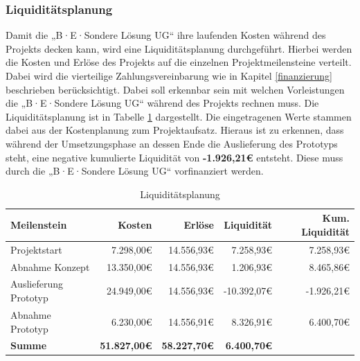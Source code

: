 \documentclass[
  a4paper,
  12pt,
  DIV=12,        %
  parskip=half,  %
  headings=small %
]{scrartcl}
\theoremstyle{definition}
\theoremstyle{definition}
\begin{document}
\subsubsection{Liquiditätsplanung}\label{Liquiditätsplanung}
Damit die „B·E·Sondere Lösung UG`` ihre laufenden Kosten während des Projekts decken kann, wird eine Liquiditätsplanung durchgeführt. Hierbei werden die Kosten und Erlöse des Projekts auf die einzelnen Projektmeilensteine verteilt. Dabei wird die vierteilige Zahlungsvereinbarung wie in Kapitel \ref{finanzierung} beschrieben berücksichtigt. Dabei soll erkennbar sein mit welchen Vorleistungen die „B·E·Sondere Lösung UG`` während des Projekts rechnen muss. Die Liquiditätsplanung ist in Tabelle \ref{tab:Liquiditaetsplanung} dargestellt. Die eingetragenen Werte stammen dabei aus der Kostenplanung zum Projektaufsatz. Hieraus ist zu erkennen, dass während der Umsetzungsphase an dessen Ende die Auslieferung des Prototyps steht, eine negative kumulierte Liquidität von \textbf{-1.926,21€} entsteht. Diese muss durch die „B·E·Sondere Lösung UG`` vorfinanziert werden. 

\begin{table}[H]
\centering
\small
\begin{tabular}{|l|r|r|r|r|}
\hline
\textbf{Meilenstein} & \textbf{Kosten} & \textbf{Erlöse} & \textbf{Liquidität} & \textbf{Kum. Liquidität} \\
\hline
Projektstart & 7.298,00€ & 14.556,93€ & 7.258,93€ & 7.258,93€ \\
\hline
Abnahme Konzept & 13.350,00€ & 14.556,93€ & 1.206,93€ & 8.465,86€ \\
\hline
Auslieferung Prototyp & 24.949,00€ & 14.556,93€ & -10.392,07€ & -1.926,21€ \\
\hline
Abnahme Prototyp & 6.230,00€ & 14.556,91€ & 8.326,91€ & 6.400,70€ \\
\hline
\textbf{Summe} & \textbf{51.827,00€} & \textbf{58.227,70€} & \textbf{6.400,70€} & \\
\hline
\end{tabular}
\caption{Liquiditätsplanung}\label{tab:Liquiditaetsplanung}
\end{table}

\newpage
\printbibliography[title={Literaturverzeichnis}]
\end{document}
